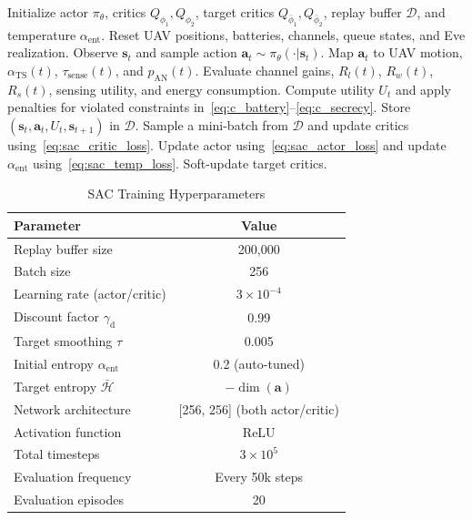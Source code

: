 \documentclass[journal]{IEEEtran}
\begin{document}
\begin{algorithm}[!t]
\caption{SAC-Based Dual-UAV Relay/Jammer Optimization}
\label{alg:sac}
\begin{algorithmic}[1]
\STATE Initialize actor $\pi_\theta$, critics $Q_{\phi_1},Q_{\phi_2}$, target critics $Q_{\bar{\phi}_1},Q_{\bar{\phi}_2}$, replay buffer $\mathcal{D}$, and temperature $\alpha_{\text{ent}}$.
\STATE Reset UAV positions, batteries, channels, queue states, and Eve realization.
\STATE Observe $\mathbf{s}_t$ and sample action $\mathbf{a}_t\sim\pi_\theta(\cdot|\mathbf{s}_t)$.
\STATE Map $\mathbf{a}_t$ to UAV motion, $\alpha_{\text{TS}}(t)$, $\tau_{\text{sense}}(t)$, and $p_{\text{AN}}(t)$.
\STATE Evaluate channel gains, $R_l(t)$, $R_w(t)$, $R_s(t)$, sensing utility, and energy consumption.
\STATE Compute utility $U_t$ and apply penalties for violated constraints in~\eqref{eq:c_battery}--\eqref{eq:c_secrecy}.
\STATE Store $(\mathbf{s}_t,\mathbf{a}_t,U_t,\mathbf{s}_{t+1})$ in $\mathcal{D}$.
\STATE Sample a mini-batch from $\mathcal{D}$ and update critics using~\eqref{eq:sac_critic_loss}.
\STATE Update actor using~\eqref{eq:sac_actor_loss} and update $\alpha_{\text{ent}}$ using~\eqref{eq:sac_temp_loss}.
\STATE Soft-update target critics.
\ENDFOR
\ENDFOR
\end{algorithmic}
\end{algorithm}

\begin{table}[!t]
\centering
\caption{SAC Training Hyperparameters}
\label{tab:sac_params}
\begin{tabular}{l c}
\toprule
\textbf{Parameter} & \textbf{Value} \\
\midrule
Replay buffer size & 200,000 \\
Batch size & 256 \\
Learning rate (actor/critic) & $3 \times 10^{-4}$ \\
Discount factor $\gamma_{\text{d}}$ & 0.99 \\
Target smoothing $\tau$ & 0.005 \\
Initial entropy $\alpha_{\text{ent}}$ & 0.2 (auto-tuned) \\
Target entropy $\bar{\mathcal{H}}$ & $-\dim(\mathbf{a})$ \\
Network architecture & [256, 256] (both actor/critic) \\
Activation function & ReLU \\
Total timesteps & $3 \times 10^5$ \\
Evaluation frequency & Every 50k steps \\
Evaluation episodes & 20 \\
\bottomrule
\end{tabular}
\end{table}
\end{document}
